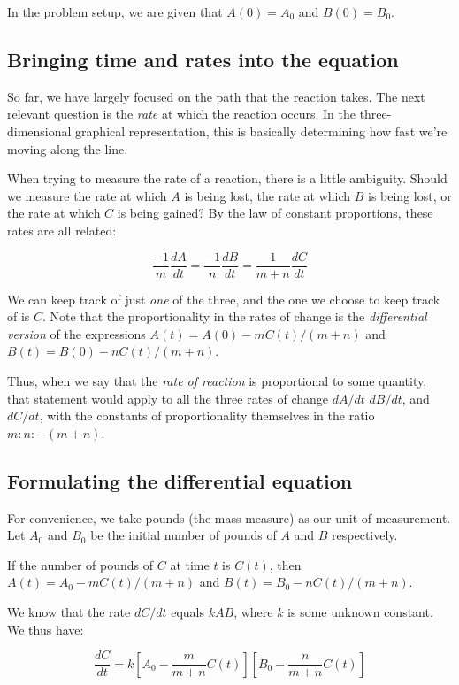 \documentclass{amsart}
\begin{document}
In the problem setup, we are given that $A(0) = A_0$ and $B(0) =
B_0$.

\subsection{Bringing time and rates into the equation}

So far, we have largely focused on the path that the reaction
takes. The next relevant question is the {\em rate} at which the
reaction occurs. In the three-dimensional graphical representation,
this is basically determining how fast we're moving along the line.

When trying to measure the rate of a reaction, there is a little
ambiguity. Should we measure the rate at which $A$ is being lost, the
rate at which $B$ is being lost, or the rate at which $C$ is being
gained? By the law of constant proportions, these rates are all related:

$$\frac{-1}{m} \frac{dA}{dt} = \frac{-1}{n} \frac{dB}{dt} = \frac{1}{m + n} \frac{dC}{dt}$$

We can keep track of just {\em one} of the three, and the one we
choose to keep track of is $C$. Note that the proportionality in the
rates of change is the {\em differential version} of the expressions
$A(t) = A(0) - mC(t)/(m + n)$ and $B(t) = B(0) - nC(t)/(m + n)$.

Thus, when we say that the {\em rate of reaction} is proportional to
some quantity, that statement would apply to all the three rates of
change $dA/dt$ $dB/dt$, and $dC/dt$, with the constants of
proportionality themselves in the ratio $m:n:-(m + n)$.

\subsection{Formulating the differential equation}

For convenience, we take pounds (the mass measure) as our unit of
measurement. Let $A_0$ and $B_0$ be the initial number of pounds of
$A$ and $B$ respectively.

If the number of pounds of $C$ at time $t$ is $C(t)$, then $A(t) = A_0
- mC(t)/(m + n)$ and $B(t) = B_0 - nC(t)/(m + n)$.

We know that the rate $dC/dt$ equals $kAB$, where $k$ is some unknown
constant. We thus have:

$$\frac{dC}{dt} = k\left[A_0 - \frac{m}{m + n}C(t) \right]\left[B_0 - \frac{n}{m + n}C(t) \right]$$
\end{document}
